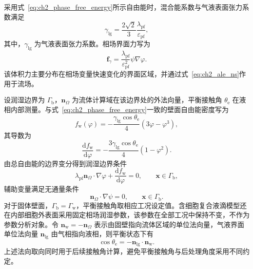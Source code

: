 采用式~\eqref{eq:ch2_phase_free_energy}所示自由能时，混合能系数与气液表面张力系数满足
\begin{equation}
\gamma_{\mathrm{lg}}
=
\frac{2\sqrt{2}}{3}
\frac{\lambda_{\mathrm{pf}}}{\varepsilon_{\mathrm{pf}}},
\label{eq:ch2_surface_tension_relation}
\end{equation}
其中，$\gamma_{\mathrm{lg}}$ 为气液表面张力系数。相场界面力写为
\begin{equation}
\boldsymbol{f}_{\gamma}
=
\frac{\lambda_{\mathrm{pf}}}{\varepsilon_{\mathrm{pf}}^2}
\psi\nabla\varphi.
\label{eq:ch2_phase_surface_force}
\end{equation}
该体积力主要分布在相场变量快速变化的界面区域，并通过式~\eqref{eq:ch2_ale_ns}作用于流场。

设润湿边界为 $\Gamma_{\mathrm b}$，$\boldsymbol{n}_{\Omega}$ 为流体计算域在该边界处的外法向量，平衡接触角 $\theta_{\mathrm e}$ 在液相内部测量。与式~\eqref{eq:ch2_phase_free_energy}一致的壁面自由能密度写为
\begin{equation}
f_{\mathrm w}(\varphi)
=
-\frac{\gamma_{\mathrm{lg}}\cos\theta_{\mathrm e}}{4}
\left(3\varphi-\varphi^3\right),
\label{eq:ch2_wall_free_energy}
\end{equation}
其导数为
\begin{equation}
\frac{\mathrm df_{\mathrm w}}{\mathrm d\varphi}
=
-\frac{3\gamma_{\mathrm{lg}}\cos\theta_{\mathrm e}}{4}
\left(1-\varphi^2\right).
\label{eq:ch2_wall_energy_derivative}
\end{equation}
由总自由能的边界变分得到润湿边界条件
\begin{equation}
\lambda_{\mathrm{pf}}
\boldsymbol{n}_{\Omega}\cdot\nabla\varphi
+
\frac{\mathrm df_{\mathrm w}}{\mathrm d\varphi}
=0,
\qquad
\boldsymbol{x}\in\Gamma_{\mathrm b},
\label{eq:ch2_wetting_bc}
\end{equation}
辅助变量满足无通量条件
\begin{equation}
\boldsymbol{n}_{\Omega}\cdot\nabla\psi=0,
\qquad
\boldsymbol{x}\in\Gamma_{\mathrm b}.
\label{eq:ch2_chemical_no_flux}
\end{equation}
对于固体壁面，$\Gamma_{\mathrm b}=\Gamma_{\mathrm w}$，平衡接触角取相应工况设定值。含细胞复合液滴模型还在内部细胞外表面采用固定相场润湿参数，该参数在全部工况中保持不变，不作为参数分析对象。令 $\boldsymbol{n}_{\mathrm w}=-\boldsymbol{n}_{\Omega}$ 表示由固壁指向流体区域的单位法向量，气液界面单位法向量 $\boldsymbol{n}_{\mathrm{lg}}$ 由气相指向液相，则平衡状态下有
\begin{equation}
\cos\theta_{\mathrm e}
=
-\boldsymbol{n}_{\mathrm{lg}}\cdot\boldsymbol{n}_{\mathrm w}.
\label{eq:ch2_contact_angle_geometry}
\end{equation}
上述法向取向同时用于后续接触角计算，避免平衡接触角与后处理角度采用不同约定\cite{deGennes1985wetting,bonn2009wetting,snoeijer2013moving}。

